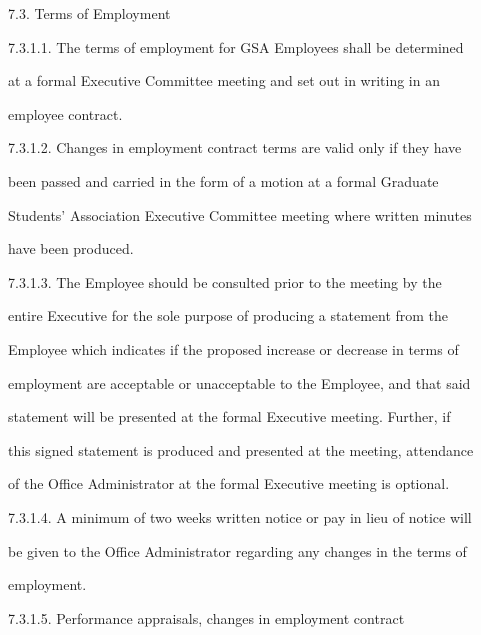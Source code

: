                           7.3.     Terms of Employment  



 7.3.1.1. The  terms  of  employment  for  GSA  Employees  shall  be  determined  

 at  a  formal Executive Committee meeting and set out in writing in an  

 employee contract.  



   



 7.3.1.2. Changes  in  employment  contract  terms  are  valid  only  if  they  have  

 been  passed and carried in the form of a motion at a formal Graduate  

 Students' Association Executive Committee meeting where written minutes  

 have been produced.  



  



7.3.1.3.  The  Employee  should  be  consulted  prior  to  the  meeting  by  the  

entire  Executive  for  the  sole  purpose  of  producing  a  statement  from  the  

Employee  which  indicates  if  the  proposed  increase  or  decrease  in  terms  of  

employment  are  acceptable  or unacceptable  to  the  Employee,  and  that  said  

statement  will  be  presented  at  the  formal  Executive  meeting.    Further,  if  

this signed  statement  is  produced  and presented  at  the  meeting,  attendance  

of the Office Administrator at the formal Executive meeting is optional.  



  



7.3.1.4. A minimum  of two weeks written notice or pay  in  lieu  of notice will  

be  given  to the  Office  Administrator  regarding  any  changes  in  the  terms of  

employment.  



  



7.3.1.5.  Performance      appraisals,      changes      in      employment      contract    


